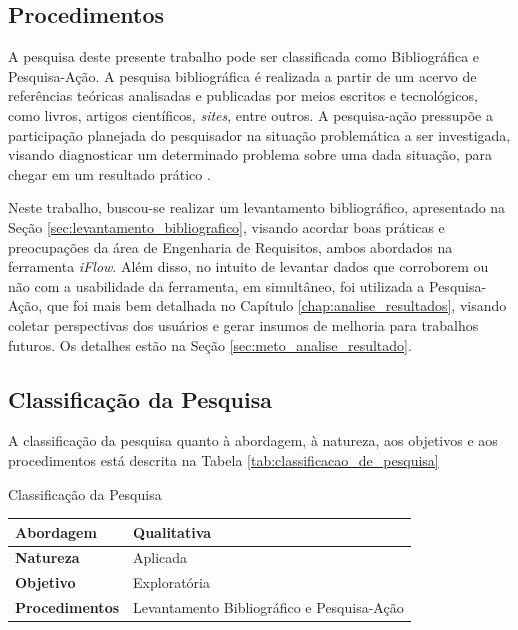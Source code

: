 \subsection{Procedimentos}

A pesquisa deste presente trabalho pode ser classificada como Bibliográfica e Pesquisa-Ação. A pesquisa bibliográfica é realizada a partir de um acervo de referências teóricas analisadas e publicadas por meios escritos e tecnológicos, como livros, artigos científicos, \textit{sites}, entre outros. A pesquisa-ação pressupõe a participação planejada do pesquisador na situação problemática a ser investigada, visando diagnosticar um determinado problema sobre uma dada situação, para chegar em um resultado prático \cite{gil2002elaborar}.

Neste trabalho, buscou-se realizar um levantamento bibliográfico, apresentado na Seção \ref{sec:levantamento_bibliografico}, visando acordar boas práticas e preocupações da área de Engenharia de Requisitos, ambos abordados na ferramenta \textit{iFlow}. Além disso, no intuito de levantar dados que corroborem ou não com a usabilidade da ferramenta, em simultâneo, foi utilizada a Pesquisa-Ação, que foi mais bem detalhada no Capítulo \ref{chap:analise_resultados}, visando coletar perspectivas dos usuários e gerar insumos de melhoria para trabalhos futuros. Os detalhes estão na Seção \ref{sec:meto_analise_resultado}.

\subsection{Classificação da Pesquisa}
A classificação da pesquisa quanto à abordagem, à natureza, aos objetivos e aos procedimentos está descrita na Tabela \ref{tab:classificacao_de_pesquisa}

\begin{quadro}[H]
\caption{Classificação da Pesquisa}
\centering
\begin{tabular}{L{0.15\textheight}|L{0.45\textheight}}
    \hline
    \textbf{Abordagem} & Qualitativa \\
    \hline
    \textbf{Natureza}  & Aplicada \\
    \hline
    \textbf{Objetivo}  & Exploratória \\
    \hline
    \textbf{Procedimentos}  & Levantamento Bibliográfico e Pesquisa-Ação \\ \hline
\end{tabular}
\label{tab:classificacao_de_pesquisa}
\end{quadro}

